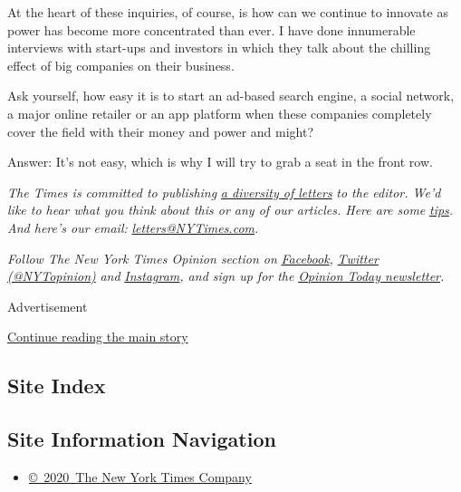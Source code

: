 At the heart of these inquiries, of course, is how can we continue to
innovate as power has become more concentrated than ever. I have done
innumerable interviews with start-ups and investors in which they talk
about the chilling effect of big companies on their business.

Ask yourself, how easy it is to start an ad-based search engine, a
social network, a major online retailer or an app platform when these
companies completely cover the field with their money and power and
might?

Answer: It's not easy, which is why I will try to grab a seat in the
front row.

\emph{The Times is committed to publishing}
\href{https://www.nytimes3xbfgragh.onion/2019/01/31/opinion/letters/letters-to-editor-new-york-times-women.html}{\emph{a
diversity of letters}} \emph{to the editor. We'd like to hear what you
think about this or any of our articles. Here are some}
\href{https://help.nytimes3xbfgragh.onion/hc/en-us/articles/115014925288-How-to-submit-a-letter-to-the-editor}{\emph{tips}}\emph{.
And here's our email:}
\href{mailto:letters@NYTimes.com}{\emph{letters@NYTimes.com}}\emph{.}

\emph{Follow The New York Times Opinion section on}
\href{https://www.facebookcorewwwi.onion/nytopinion}{\emph{Facebook}}\emph{,}
\href{http://twitter.com/NYTOpinion}{\emph{Twitter (@NYTopinion)}}
\emph{and}
\href{https://www.instagram.com/nytopinion/}{\emph{Instagram}}\emph{,
and sign up for the}
\href{http://www.nytimes3xbfgragh.onion/newsletters/opiniontoday/}{\emph{Opinion
Today newsletter}}\emph{.}

Advertisement

\protect\hyperlink{after-bottom}{Continue reading the main story}

\hypertarget{site-index}{%
\subsection{Site Index}\label{site-index}}

\hypertarget{site-information-navigation}{%
\subsection{Site Information
Navigation}\label{site-information-navigation}}

\begin{itemize}
\tightlist
\item
  \href{https://help.nytimes3xbfgragh.onion/hc/en-us/articles/115014792127-Copyright-notice}{©~2020~The
  New York Times Company}
\end{itemize}

